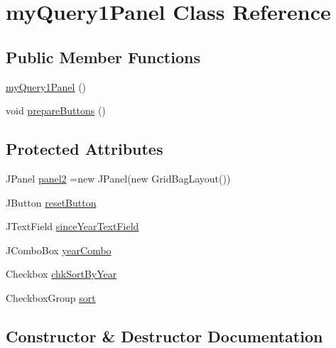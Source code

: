 \hypertarget{classmy_query1_panel}{}\section{my\+Query1\+Panel Class Reference}
\label{classmy_query1_panel}
\subsection*{Public Member Functions}
\begin{DoxyCompactItemize}
\item 
\hyperlink{classmy_query1_panel_add6c4e09fbce53ae0b2eb34e2da0c55e}{my\+Query1\+Panel} ()
\item 
void \hyperlink{classmy_query1_panel_a0a640aa15c5356a9eab718201267a245}{prepare\+Buttons} ()
\end{DoxyCompactItemize}
\subsection*{Protected Attributes}
\begin{DoxyCompactItemize}
\item 
J\+Panel \hyperlink{classmy_query1_panel_aba2fe28e793bc84fe789e98c7b89e065}{panel2} =new J\+Panel(new Grid\+Bag\+Layout())
\item 
J\+Button \hyperlink{classmy_query1_panel_a0e0a620150837e7d0caa3386fdd1879b}{reset\+Button}
\item 
J\+Text\+Field \hyperlink{classmy_query1_panel_a60b95255f8c6ffeb063ca97c79206c49}{since\+Year\+Text\+Field}
\item 
J\+Combo\+Box \hyperlink{classmy_query1_panel_ac662f986c33598e85559ac3d93f634b0}{year\+Combo}
\item 
Checkbox \hyperlink{classmy_query1_panel_a112a1c15d47ccd9a16a3d5d4e7211809}{chk\+Sort\+By\+Year}
\item 
Checkbox\+Group \hyperlink{classmy_query1_panel_a5ae5e5e6cfc109b6a15ac6811604a5c1}{sort}
\end{DoxyCompactItemize}


\subsection{Constructor \& Destructor Documentation}
\hypertarget{classmy_query1_panel_add6c4e09fbce53ae0b2eb34e2da0c55e}{}\label{classmy_query1_panel_add6c4e09fbce53ae0b2eb34e2da0c55e} 
